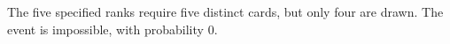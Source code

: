 The five specified ranks require five distinct cards, but only four are drawn. The event is impossible, with probability $\boxed0 $.
